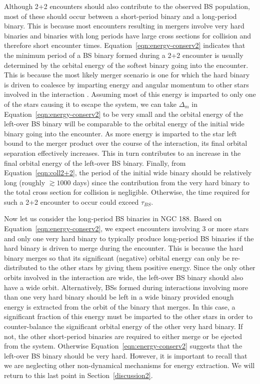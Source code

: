 \begin{enumerate}
Although 2+2 encounters should also contribute to the observed BS
population, most of these should occur between a short-period binary
and a long-period binary.  This is because most encounters resulting in mergers
involve very hard binaries and binaries with long periods have 
large cross sections for collision and therefore short encounter
times.  Equation~\ref{eqn:energy-conserv2} indicates that
the minimum period of a BS binary formed during a 2+2 encounter is
usually determined by the orbital energy of the softest binary going
into the encounter.  This is because the most likely merger scenario
is one for which the hard binary is driven to coalesce by imparting
energy and angular momentum to other stars involved in the interaction 
\citep{fregeau04}.  Assuming most of 
this energy is imparted to only one of the stars causing it to escape 
the system, we can take $\Delta_m$ in
Equation~\ref{eqn:energy-conserv2} to be very small and the orbital
energy of the left-over BS 
binary will be comparable to the orbital energy of the initial wide
binary going into the encounter.  As more energy is imparted to the
star left bound to the 
merger product over the course of the interaction, its final orbital
separation effectively increases.  This in turn contributes to an increase 
in the final orbital energy of the left-over BS binary.  
Finally, from Equation~\ref{eqn:coll2+2}, the period
of the initial wide binary should be relatively long (roughly $\gtrsim
1000$ days) since the contribution from the very hard binary to the
total cross section for collision is negligible.  Otherwise, the time
required for such a 2+2 encounter to occur could exceed $\tau_{BS}$.

Now let us consider the long-period BS binaries in NGC 188.  Based on 
Equation~\ref{eqn:energy-conserv2}, we expect encounters involving
3 or more stars and only one very hard binary to typically produce
long-period BS binaries if the hard binary is driven to merge during
the encounter.  This is because the hard binary merges so that its
significant (negative) orbital energy can only be re-distributed to
the other stars by giving them positive energy.  Since the only other
orbits involved in the interaction are wide, the left-over BS binary
should also have a wide orbit.  Alternatively, BSs formed during
interactions involving more than one very hard 
binary should be left in a wide binary provided enough energy is
extracted from the orbit of the binary that merges.  In this case, a
significant 
fraction of this energy must be imparted to the other stars in order
to counter-balance the significant orbital energy of the other very
hard binary.  If not, the other short-period 
binaries are required to either merge or be ejected from the
system.  Otherwise
Equation~\ref{eqn:energy-conserv2} suggests that the left-over BS
binary should be very hard.  However, it is important to recall that we
are neglecting other non-dynamical mechanisms for energy extraction.
We will return to this last point in Section~\ref{discussion2}.  


\end{enumerate}
